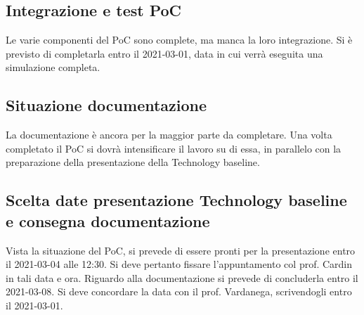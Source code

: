 \subsection*{Integrazione e test PoC}
Le varie componenti del PoC sono complete, ma manca la loro integrazione. Si è previsto di completarla entro il 2021-03-01, data in cui verrà eseguita una simulazione completa.

\subsection*{Situazione documentazione}
La documentazione è ancora per la maggior parte da completare. Una volta completato il PoC si dovrà intensificare il lavoro su di essa, in parallelo con la preparazione della presentazione della Technology baseline.

\subsection*{Scelta date presentazione Technology baseline e consegna documentazione}
Vista la situazione del PoC, si prevede di essere pronti per la presentazione entro il 2021-03-04 alle 12:30. Si deve pertanto fissare l'appuntamento col prof. Cardin in tali data e ora.
Riguardo alla documentazione si prevede di concluderla entro il 2021-03-08. Si deve concordare la data con il prof. Vardanega, scrivendogli entro il 2021-03-01.


